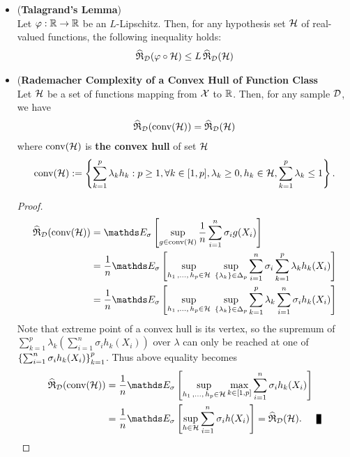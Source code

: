\documentclass[11pt]{article}
\begin{document}
\begin{itemize}
\item \begin{corollary} (\textbf{Talagrand's Lemma}) \citep{mohri2018foundations}\\
Let $\varphi: {\mathbb R} \to {\mathbb R}$ be an $L$-Lipschitz. Then, for any hypothesis set ${\mathcal H}$ of real-valued functions, the following inequality holds:
\begin{align}
\widehat{{\mathfrak R}}_{{\mathcal D}}(\varphi \circ {\mathcal H})  \le L\, \widehat{{\mathfrak R}}_{{\mathcal D}}({\mathcal H}) \label{ineqn: rademacher_complexity_contraction}
\end{align}
\end{corollary}

\item \begin{proposition}(\textbf{Rademacher Complexity of a Convex Hull of Function Class}\\
Let ${\mathcal H}$ be a set of functions mapping from ${\mathcal X}$ to ${\mathbb R}$. Then, for any sample ${\mathcal D}$, we have
\begin{align}
\widehat{{\mathfrak R}}_{{\mathcal D}}(\text{conv}({\mathcal H}))  = \widehat{{\mathfrak R}}_{{\mathcal D}}({\mathcal H}) \label{eqn: rademacher_complexity_convex_hull}
\end{align} where $\text{conv}({\mathcal H})$ is \textbf{the convex hull} of set ${\mathcal H}$
\begin{align*}
\text{conv}({\mathcal H}) := \left\{\sum_{k=1}^{p}\lambda_k h_k:  p \ge 1, \forall k \in [1, p], \lambda_k \ge 0, h_k \in {\mathcal H}, \sum_{k=1}^{p}\lambda_k \le 1\right\}.
\end{align*}
\end{proposition}
\begin{proof}
\begin{align*}
\widehat{\frR}_{\cD}(\text{conv}(\cH))  &= \E{\sigma}{\sup_{g \in \text{conv}(\cH)}\frac{1}{n}\sum_{i=1}^{n}\sigma_i g(X_i) }\\
&= \frac{1}{n}\E{\sigma}{\sup_{h_{1} \xdotx{,} h_{p} \in \cH}\;\sup_{ \set{\lambda_k} \in \Delta_{p} }\sum_{i=1}^{n}\sigma_i \sum_{k=1}^{p}\lambda_k h_{k}(X_i)}\\
&= \frac{1}{n}\E{\sigma}{\sup_{h_{1} \xdotx{,} h_{p} \in \cH}\;\sup_{ \set{\lambda_k} \in \Delta_{p} }\sum_{k=1}^{p}\lambda_k\sum_{i=1}^{n}\sigma_i  h_{k}(X_i)}
\end{align*} Note that extreme point of a convex hull is its vertex, so the supremum of $\sum_{k=1}^{p}\lambda_k (\sum_{i=1}^{n}\sigma_i  h_k(X_i))$ over $\lambda$ can only be reached at one of $\left\{\sum_{i=1}^{n}\sigma_i  h_{k}(X_i)\right\}_{k=1}^{p}$. Thus above equality becomes
\begin{align*}
\widehat{\frR}_{\cD}(\text{conv}(\cH))  &= \frac{1}{n}\E{\sigma}{\sup_{h_{1} \xdotx{,} h_{p} \in \cH}\max_{k \in [1,p]}\sum_{i=1}^{n}\sigma_i  h_{k}(X_i)}\\
&= \frac{1}{n}\E{\sigma}{\sup_{h \in \cH}\sum_{i=1}^{n}\sigma_i  h(X_i)} = \widehat{\frR}_{\cD}(\cH). \qed
\end{align*}
\end{proof}
\end{itemize}
\end{document}
